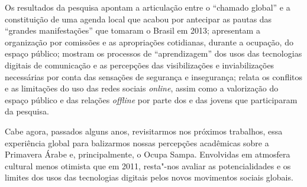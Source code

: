 Os resultados da pesquisa apontam a articulação entre o ``chamado
global'' e a constituição de uma agenda local que acabou por antecipar
as pautas das ``grandes manifestações'' que tomaram o Brasil em 2013;
apresentam a organização por comissões e as apropriações cotidianas,
durante a ocupação, do espaço público; mostram os processos de
``aprendizagem'' dos usos das tecnologias digitais de comunicação e as
percepções das visibilizações e inviabilizações necessárias por conta
das sensações de segurança e insegurança; relata os conflitos e as
limitações do uso das redes sociais \emph{online}, assim como a
valorização do espaço público e das relações \emph{offline} por parte
dos e das jovens que participaram da pesquisa.

Cabe agora, passados alguns anos, revisitarmos nos próximos trabalhos,
essa experiência global para balizarmos nossas percepções acadêmicas
sobre a Primavera Árabe e, principalmente, o Ocupa Sampa. Envolvidas
em atmosfera cultural menos otimista que em 2011, resta"-nos avaliar as
potencialidades e os limites dos usos das tecnologias digitais pelos
novos movimentos sociais globais.


